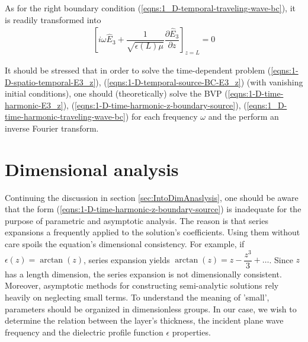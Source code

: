 \documentclass[12pt,twoside]{report}
\begin{document}
As for the right boundary condition (\ref{eqns:1_D-temporal-traveling-wave-bc}), it is readily transformed into
\begin{align}
\label{eqns:1_D-time-harmonic-traveling-wave-bc}
\left[ i \omega \hat{E}_3 + \dfrac{1}{\sqrt{\epsilon(L)\mu}} \dfrac{\partial \hat{E}_3}{\partial z} \right]_{z = L}=0
\end{align}

It should be stressed that in order to solve the time-dependent problem (\ref{eqns:1-D-spatio-temporal-E3_z}), (\ref{eqns:1-D-temporal-source-BC-E3_z}) (with vanishing initial conditions), one should (theoretically) solve the BVP
(\ref{eqns:1-D-time-harmonic-E3_z}), (\ref{eqns:1-D-time-harmonic-z-boundary-source}), (\ref{eqns:1_D-time-harmonic-traveling-wave-bc}) for each frequency $\omega$ and the perform an inverse Fourier transform.\\


\section{Dimensional analysis }
Continuing the discussion in section \ref{sec:IntoDimAnaslysis}, one should be aware that the form (\ref{eqns:1-D-time-harmonic-z-boundary-source}) is inadequate for the purpose of parametric and asymptotic analysis. The reason is that series expansions a frequently applied to the solution's coefficients. Using them without care spoils the equation's dimensional consistency. For example, if $\epsilon(z) = \arctan(z)$, series expansion yields $\arctan(z) = z-\dfrac{z^3}{3} + \ldots$. Since $z$ has a length dimension, the series expansion is not dimensionally consistent. Moreover, asymptotic methods for constructing semi-analytic solutions rely heavily on neglecting small terms. To understand the meaning of 'small', parameters should be organized in dimensionless groups. In our case, we wish to determine the relation between the layer's thickness, the incident plane wave frequency and the dielectric profile function $\epsilon$ properties.
\begin{comment} 
\begin{itemize}
\item The dielectric profile's dynamic range - the difference between its $-\infty$ and $+\infty$ values, normalized by the $-\infty$ limit to  get an 'effective jump' measure;
\item The dielectric profile's proximity to a step function, essentially expressed by the size of the function's $z$-derivative at $z=0$ and the rate of its decay toward $\pm \infty$.
\end{itemize}
\end{comment}
\end{document}
